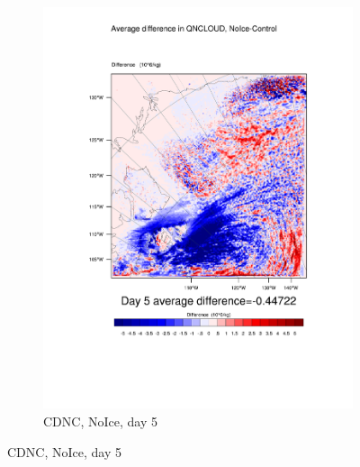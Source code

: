 \begin{figure}[hb]
\begin{subfigure}{0.40\textwidth}
		\includegraphics[width=\textwidth]{results/noice/diff_NoIce_QNCLOUD_Day5.pdf}
		\caption{CDNC, NoIce, day 5}
		\label{subfig:CDNCr2Day5}
	\end{subfigure}
	

\end{figure}
